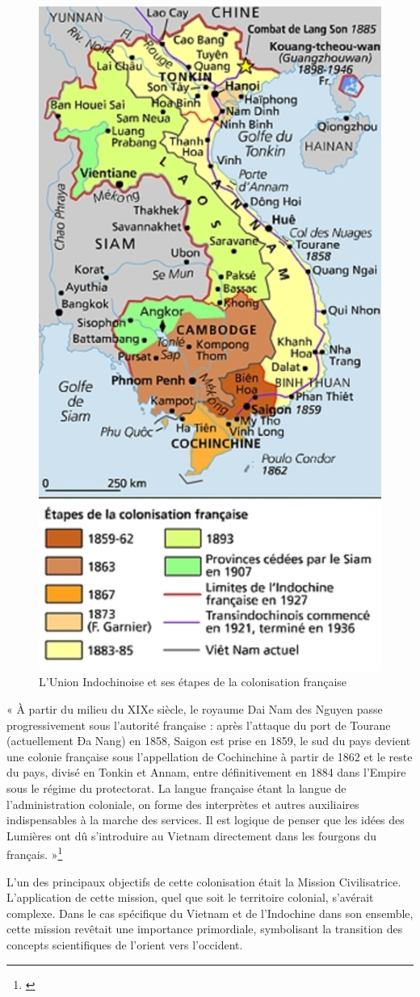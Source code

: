 \begin{figure}[H]
    \centering
    \includegraphics[width=0.5\linewidth]{img/1.1.union indochinoise.jpg}
    \caption{L'Union Indochinoise et ses étapes de la colonisation française}
    \label{fig:enter-label}
\end{figure}

« À partir du milieu du XIXe siècle, le royaume Dai Nam des Nguyen passe progressivement sous l’autorité française : après l’attaque du port de Tourane (actuellement Đa Nang) en 1858, Saigon est prise en 1859, le sud du pays devient une colonie française sous l’appellation de Cochinchine à partir de 1862 et le reste du pays, divisé en Tonkin et Annam, entre définitivement en 1884 dans l’Empire sous le régime du protectorat. La langue française étant la langue de l’administration coloniale, on forme des interprètes et autres auxiliaires indispensables à la marche des services. Il est logique de penser que les idées des Lumières ont dû s’introduire au Vietnam directement dans les fourgons du français. »\footnote{\cite{colon}}

L'un des principaux objectifs de cette colonisation était la Mission Civilisatrice. L'application de cette mission, quel que soit le territoire colonial, s'avérait complexe. Dans le cas spécifique du Vietnam et de l'Indochine dans son ensemble, cette mission revêtait une importance primordiale, symbolisant la transition des concepts scientifiques de l'orient vers l'occident.


